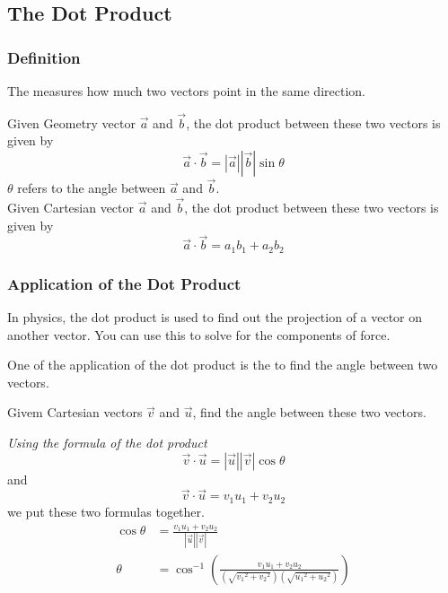 \subsection{The Dot Product}
\subsubsection{Definition}
\begin{definition} 
The  measures how much two vectors point in the same direction.
\end{definition}

Given Geometry vector $\vec{a}$ and $\vec{b}$, the dot product between these two vectors is given by 
$$\vec{a} \cdot \vec{b} = \left|\vec{a}\right|\left|\vec{b}\right|\sin \theta$$
$\theta$ refers to the angle between $\vec{a}$ and $\vec{b}$.\\

Given Cartesian vector $\vec{a}$ and $\vec{b}$, the dot product between these two vectors is given by 
$$\vec{a} \cdot \vec{b} = a_1b_1 + a_2b_2$$

\subsubsection{Application of the Dot Product}
In physics, the dot product is used to find out the projection of a vector on another vector. 
You can use this to solve for the components of force. 

One of the application of the dot product is the to find the angle between two vectors.
\begin{example}
    Givem Cartesian vectors $\vec{v}$ and $\vec{u}$, find the angle between these two vectors. 

    \textit{Using the formula of the dot product}
    $$\vec{v} \cdot \vec{u}= \left|\vec{u}\right| \left|\vec{v}\right|\cos \theta$$
    and 
    $$\vec{v} \cdot \vec{u} = v_1u_1 + v_2u_2$$
    we put these two formulas together. 
    \begin{align*}
        \cos \theta &= \frac{
            v_1u_1 + v_2u_2
        }{\left|\vec{u}\right|\left|\vec{v}\right|} \\
        \theta &= \cos^{-1} \left(\frac{
            v_1u_1 + v_2u_2
        }{
            \left(\sqrt{{v_1}^2 + {v_2}^2}\right) \left(\sqrt{{u_1}^2 + {u_2}^2}\right)
        } \right )
    \end{align*}
\end{example} 

